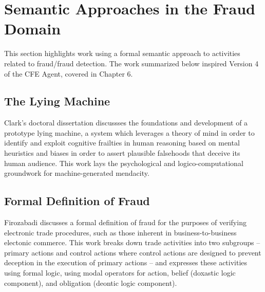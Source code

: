 \section{Semantic Approaches in the Fraud Domain}

This section highlights work using a formal semantic approach to activities related to fraud/fraud detection.  The work summarized below inspired Version 4 of the CFE Agent, covered in Chapter 6.

\subsection{The Lying Machine}

Clark's doctoral dissertation \cite{Clark:2010:CIL:2019791} discussses the foundations and development of a prototype lying machine, a system which leverages a theory of mind in order to identify and exploit cognitive frailties in human reasoning based on mental heuristics and biases in order to assert plausible falsehoods that deceive its human audience.  This work lays the psychological and logico-computational groundwork for machine-generated mendacity.

\subsection{Formal Definition of Fraud}

Firozabadi \cite{firozabadi1999formal} discusses a formal definition of fraud for the purposes of verifying electronic trade procedures, such as those inherent in business-to-business electonic commerce.  This work breaks down trade activities into two subgroups -- primary actions and control actions where control actions are designed to prevent deception in the execution of primary actions -- and expresses these activities using formal logic, using modal operators for action, belief (doxastic logic component), and obligation (deontic logic component).










